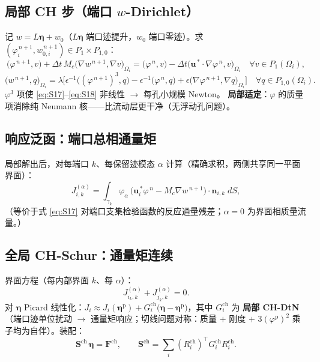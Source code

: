 \documentclass[11pt]{article}
\theoremstyle{definition}
\theoremstyle{plain}
\theoremstyle{remark}
\newcommand{\vel}{\bm{u}}
\newcommand{\normal}{\bm{n}}
\newcommand{\iface}{\gamma}
\newcommand{\Schur}{\mathbf{S}}
\begin{document}
\subsection{局部 CH 步（端口 $w$-Dirichlet）}

记 $w=L\bm\eta+w_0$（$L\bm\eta$ 端口迹提升，$w_0$ 端口零迹）。求
$(\varphi_i^{\,n+1},w_{0,i}^{\,n+1})\in P_1\times P_{1,0}$：
\begin{equation}
\big(\varphi^{\,n+1},v\big)+\Delta t\,M_c\big(\nabla w^{\,n+1},\nabla v\big)_{\Omega_i}
=\big(\varphi^{\,n},v\big)-\Delta t\big(\vel^{\,\ast}\cdot\nabla\varphi^{\,n},v\big)_{\Omega_i}
\quad\forall v\in P_1(\Omega_i),
\tag{S17}\label{eq:S17}
\end{equation}
\begin{equation}
\big(w^{\,n+1},q\big)_{\Omega_i}
=\lambda\Big[\epsilon^{-1}\big((\varphi^{\,n+1})^3,q\big)
-\epsilon^{-1}\big(\varphi^{\,n},q\big)
+\epsilon\big(\nabla\varphi^{\,n+1},\nabla q\big)_{\Omega_i}\Big]
\quad\forall q\in P_{1,0}(\Omega_i).
\tag{S18}\label{eq:S18}
\end{equation}
$\varphi^3$ 项使 \eqref{eq:S17}--\eqref{eq:S18} 非线性 $\to$ 每孔小规模 Newton。
\textbf{局部适定}：$\varphi$ 的质量项消除纯 Neumann 核——比流动层更干净（无浮动孔问题）。

\subsection{响应泛函：端口总相通量矩}

局部解出后，对每端口 $k$、每保留迹模态 $\alpha$ 计算（精确求积，两侧共享同一平面界面）：
\begin{equation}
J_{i,k}^{(\alpha)}=\int_{\iface_k}\varphi_\alpha\,
\big(\vel_i^{\,\ast}\varphi^{\,n}-M_c\nabla w^{\,n+1}\big)\cdot\normal_{i,k}\;dS,
\tag{S19}\label{eq:S19}
\end{equation}
（等价于式 \eqref{eq:S17} 对端口支集检验函数的反应通量残差；$\alpha=0$ 为界面相质量流量。）

\subsection{全局 CH-Schur：通量矩连续}

界面方程（每内部界面 $k$、每 $\alpha$）：
\begin{equation}
J_{i_k,k}^{(\alpha)}+J_{j_k,k}^{(\alpha)}=0.
\tag{S20}\label{eq:S20}
\end{equation}
对 $\bm\eta$ Picard 线性化：$J_i\approx J_i(\bm\eta^{\mathrm p})
+G_i^{\mathrm{ch}}\big(\bm\eta-\bm\eta^{\mathrm p}\big)$，其中 $G_i^{\mathrm{ch}}$ 为
\textbf{局部 CH-DtN}（端口迹单位扰动 $\to$ 通量矩响应；切线问题对称：质量 $+$ 刚度
$+$ $3(\varphi^{\mathrm p})^2$ 乘子均为自伴）。装配：
\begin{equation}
\Schur^{\mathrm{ch}}\,\bm\eta=\mathbf F^{\mathrm{ch}},
\qquad
\Schur^{\mathrm{ch}}=\sum_i (R_i^{\mathrm{ch}})^{\!\top}G_i^{\mathrm{ch}}R_i^{\mathrm{ch}}.
\tag{S21}\label{eq:S21}
\end{equation}
\end{document}

